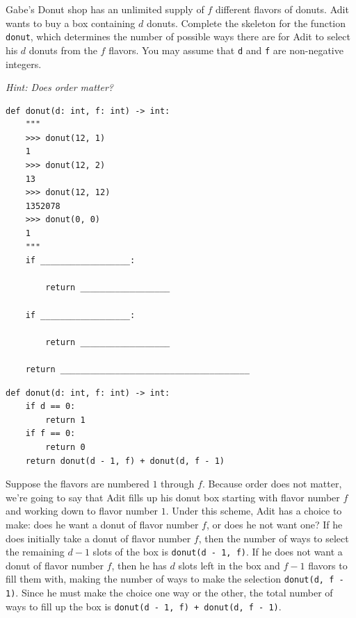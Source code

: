 \begin{blocksection}
\question Gabe's Donut shop has an unlimited supply of $f$ different flavors of donuts. Adit wants to buy a box containing $d$ donuts.
Complete the skeleton for the function \lstinline{donut}, which determines the number of possible ways there are for Adit to select his
 $d$ donuts from the $f$ flavors. You may assume that \lstinline{d} and \lstinline{f} are non-negative integers.

\textit{Hint: Does order matter?}

\begin{lstlisting}
def donut(d: int, f: int) -> int:
    """
    >>> donut(12, 1)
    1
    >>> donut(12, 2)
    13
    >>> donut(12, 12)
    1352078
    >>> donut(0, 0)
    1
    """
    if __________________:

        return __________________

    if __________________:

        return __________________

    return ______________________________________
\end{lstlisting}

\begin{solution}[0in]
\begin{lstlisting}
def donut(d: int, f: int) -> int:
    if d == 0:
        return 1
    if f == 0:
        return 0
    return donut(d - 1, f) + donut(d, f - 1)
\end{lstlisting}

Suppose the flavors are numbered $1$ through $f$. Because order does not matter, we're going to say that Adit fills up his donut box starting with flavor number $f$ and working down to flavor number $1$. Under this scheme, Adit has a choice to make: does he want a donut of flavor number $f$, or does he not want one? If he does initially take a donut of flavor number $f$, then the number of ways to select the remaining $d - 1$ slots of the box is \lstinline{donut(d - 1, f)}. If he does not want a donut of flavor number $f$, then he has $d$ slots left in the box and $f - 1$ flavors to fill them with, making the number of ways to make the selection \lstinline{donut(d, f - 1)}. Since he must make the choice one way or the other, the total number of ways to fill up the box is \lstinline{donut(d - 1, f) + donut(d, f - 1)}.
\end{solution}
\end{blocksection}

